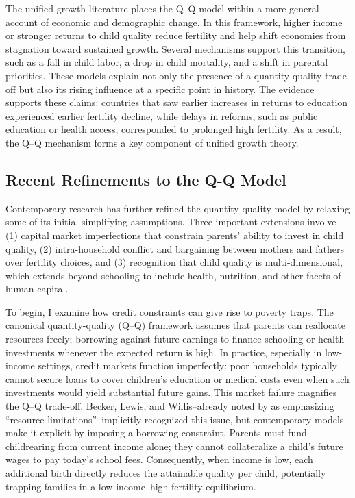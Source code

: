 \documentclass[]{AEA}
\begin{document}
The unified growth literature places the Q--Q model within a more
general account of economic and demographic change. In this framework,
higher income or stronger returns to child quality reduce fertility and
help shift economies from stagnation toward sustained growth. Several
mechanisms support this transition, such as a fall in child labor, a
drop in child mortality, and a shift in parental priorities. These
models explain not only the presence of a quantity-quality trade-off but
also its rising influence at a specific point in history. The evidence
supports these claims: countries that saw earlier increases in returns
to education experienced earlier fertility decline, while delays in
reforms, such as public education or health access, corresponded to
prolonged high fertility. As a result, the Q--Q mechanism forms a key
component of unified growth theory.

\subsection{Recent Refinements to the Q-Q Model}

Contemporary research has further refined the quantity-quality model by
relaxing some of its initial simplifying assumptions. Three important
extensions involve (1) capital market imperfections that constrain
parents' ability to invest in child quality, (2) intra-household
conflict and bargaining between mothers and fathers over fertility
choices, and (3) recognition that child quality is multi-dimensional,
which extends beyond schooling to include health, nutrition, and other
facets of human capital.

To begin, I examine how credit constraints can give rise to poverty
traps. The canonical quantity-quality (Q--Q) framework assumes that
parents can reallocate resources freely; borrowing against future
earnings to finance schooling or health investments whenever the
expected return is high. In practice, especially in low-income settings,
credit markets function imperfectly: poor households typically cannot
secure loans to cover children's education or medical costs even when
such investments would yield substantial future gains. This market
failure magnifies the Q--Q trade-off. Becker, Lewis, and Willis--already
noted by \citet{grawe2008quality} as emphasizing ``resource
limitations''--implicitly recognized this issue, but contemporary models
make it explicit by imposing a borrowing constraint. Parents must fund
childrearing from current income alone; they cannot collateralize a
child's future wages to pay today's school fees. Consequently, when
income is low, each additional birth directly reduces the attainable
quality per child, potentially trapping families in a
low-income--high-fertility equilibrium.
\end{document}
